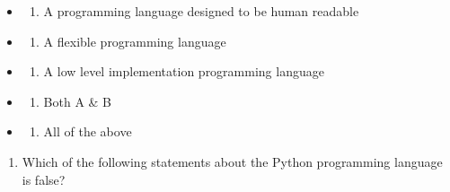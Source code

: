 \documentclass[
]{article}
\providecommand{\tightlist}{%
  \setlength{\itemsep}{0pt}\setlength{\parskip}{0pt}}
\begin{document}
\begin{itemize}
\item
  \begin{enumerate}
  \def\labelenumi{\alph{enumi}.}
  \tightlist
  \item
    A programming language designed to be human readable
  \end{enumerate}
\item
  \begin{enumerate}
  \def\labelenumi{\alph{enumi}.}
  \setcounter{enumi}{1}
  \tightlist
  \item
    A flexible programming language
  \end{enumerate}
\item
  \begin{enumerate}
  \def\labelenumi{\alph{enumi}.}
  \setcounter{enumi}{2}
  \tightlist
  \item
    A low level implementation programming language
  \end{enumerate}
\item
  \begin{enumerate}
  \def\labelenumi{\alph{enumi}.}
  \setcounter{enumi}{3}
  \tightlist
  \item
    Both A \& B
  \end{enumerate}
\item
  \begin{enumerate}
  \def\labelenumi{\alph{enumi}.}
  \setcounter{enumi}{4}
  \tightlist
  \item
    All of the above
  \end{enumerate}
\end{itemize}

\begin{enumerate}
\def\labelenumi{\arabic{enumi}.}
\setcounter{enumi}{2}
\tightlist
\item
  Which of the following statements about the Python programming
  language is false?
\end{enumerate}
\end{document}
